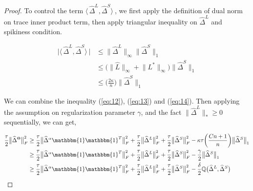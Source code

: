 \documentclass[AMS,STIX1COL]{WileyNJD-v2}
\begin{document}
{\begin{proof}
To control the term $ \big\langle\, \widehat\Delta^{L}, \widehat\Delta^{S} \big\rangle\ $, we first apply the definition of dual norm on trace inner product term, then apply triangular inequality on $\widehat{\Delta}^{L}$ and spikiness condition.

\begin{align}
    \big| \big\langle\, \widehat\Delta^{L}, \widehat\Delta^{S} \big\rangle\ \big| \nonumber
    &\leq \big\|\widehat{\Delta}^{L}\big\|_{\infty} \big\|\widehat{\Delta}^{S}\big\|_1\\ \nonumber
    &\leq \bigg(\big\|\widehat{L}\big\|_{\infty} + \big\|L^{*}\big\|_{\infty}\bigg)
    \big\|\widehat{\Delta}^{S} \big\|_{1}\\
    &\leq \bigg(\frac{2\kappa}{n}\bigg)\big\|\widehat{\Delta}^{S} \big\|_{1} \label{eq:14}
\end{align}

We can combine the inequality (\ref{eq:12}), (\ref{eq:13}) and (\ref{eq:14}). Then applying the assumption on regularization parameter $\gamma$, and the fact $\big\|\widehat{\Delta}^{L}\big\|_{\ast}\geq0$ sequentially, we can get,

\begin{align}
    \frac{\tau}{2}\big\|\widehat{\Delta}^{\Theta}\big\|_{F}^{2}  \nonumber
    &\geq \frac{\tau}{2} \big\|\widehat{\Delta}^{\alpha}\mathbbm{1}\mathbbm{1}^T\big\|_{F}^{2} + \frac{\tau}{2} \big\|\widehat{\Delta}^{L}\big\|_{F}^{2} + \frac{\tau}{2} \big\|\widehat{\Delta}^{S}\big\|_{F}^{2}
    - \kappa\tau\bigg(\frac{Cn+1}{n}\bigg)\big\|\widehat{\Delta}^{S}\big\|_{1} \\ \nonumber
    &\geq \frac{\tau}{2} \big\|\widehat{\Delta}^{\alpha}\mathbbm{1}\mathbbm{1}^T\big\|_{F}^{2} + \frac{\tau}{2} \big\|\widehat{\Delta}^{L}\big\|_{F}^{2} + \frac{\tau}{2} \big\|\widehat{\Delta}^{S}\big\|_{F}^{2} - \frac{\gamma}{2}\big\|\widehat{\Delta}^{S}\big\|_{1}\\
    &\geq \frac{\tau}{2} \big\|\widehat{\Delta}^{\alpha}\mathbbm{1}\mathbbm{1}^T\big\|_{F}^{2} + \frac{\tau}{2} \big\|\widehat{\Delta}^{L}\big\|_{F}^{2} + \frac{\tau}{2} \big\|\widehat{\Delta}^{S}\big\|_{F}^{2} - \frac{\delta}{2} \mathbb{Q}\big(\widehat{\Delta}^L,\widehat{\Delta}^S\big) \label{eq:26}
\end{align}


\end{proof}}
\end{document}
